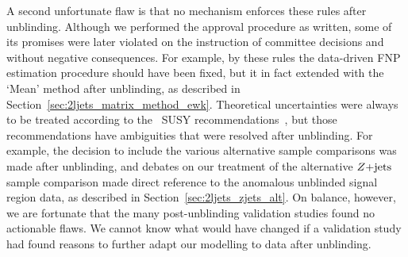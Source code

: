 A second unfortunate flaw is that no mechanism enforces these rules after
unblinding.
Although we performed the approval procedure as written, some of its promises
were later violated on the instruction of committee decisions and without
negative consequences.
For example, by these rules the data-driven FNP estimation procedure should
have been fixed, but it in fact extended with the `Mean' method after
unblinding, as described in Section~\ref{sec:2ljets_matrix_method_ewk}.
Theoretical uncertainties were always to be treated according to the
\atlas\ SUSY recommendations~\cite{atlas_twiki_susytheoretical}, but those
recommendations have ambiguities that were resolved after unblinding.
For example, the decision to include the various alternative sample comparisons
was made after unblinding, and debates on our treatment of the alternative
$Z\mathrm{+jets}$ sample comparison made direct reference to the anomalous unblinded
signal region data, as described in Section~\ref{sec:2ljets_zjets_alt}.
On balance, however, we are fortunate that the many post-unblinding validation
studies found no actionable flaws. We cannot know what would have changed if a
validation study had found reasons to further adapt our modelling to data after
unblinding.

